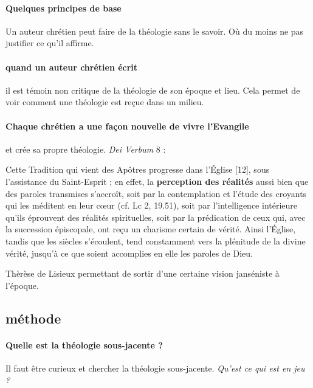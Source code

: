\paragraph{Quelques principes de base} Un auteur chrétien peut faire de la théologie sans le savoir.  Où du moins ne pas justifier ce qu'il affirme. 

\paragraph{quand un auteur chrétien écrit} il est témoin non critique de la théologie de son époque et lieu. 
Cela permet de voir comment une théologie est reçue dans un milieu.

\paragraph{Chaque chrétien a une façon nouvelle de vivre l'Evangile} et crée sa propre théologie.
\textit{Dei Verbum} 8 : 
\begin{singlequote}
    Cette Tradition qui vient des Apôtres progresse dans l’Église [12], sous l’assistance du Saint-Esprit ; en effet, la \textbf{perception des réalités }aussi bien que des paroles transmises s’accroît, soit par la contemplation et l’étude des croyants qui les méditent en leur cœur (cf. Lc 2, 19.51), soit par l’intelligence intérieure qu’ils éprouvent des réalités spirituelles, soit par la prédication de ceux qui, avec la succession épiscopale, ont reçu un charisme certain de vérité. Ainsi l’Église, tandis que les siècles s’écoulent, tend constamment vers la plénitude de la divine vérité, jusqu’à ce que soient accomplies en elle les paroles de Dieu.
\end{singlequote}

\begin{Ex}
    Thèrèse de Lisieux permettant de sortir d'une certaine vision janséniste à l'époque.
\end{Ex}

\subsection{méthode}
\paragraph{Quelle est la théologie sous-jacente ?} Il faut être curieux et chercher la théologie sous-jacente.  \textit{Qu'est ce qui est en jeu ? }

